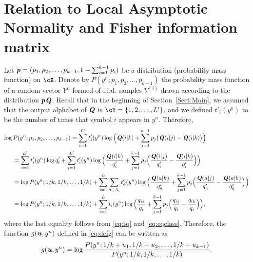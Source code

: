 \documentclass[11pt,onecolumn]{IEEEtran}
\def\mathbi#1{{\textbf{\textit #1}}}
\begin{document}
\section{Relation to Local Asymptotic Normality and Fisher information matrix}\label{ap:LAN}
Let 
$\mathbi{p}=(p_1,p_2,\dots,p_{k-1},1-\sum_{i=1}^{k-1}p_i)$ be a distribution (probability mass function) on $\cX$. 
Denote by $P(y^n;p_1,p_2,\dots,p_{k-1})$ the probability mass function of a random vector $Y^n$ formed of i.i.d. samples $Y^{(i)}$ 
drawn according to the distribution $\mathbi{p}\mathbi{Q}$. 
Recall that in the beginning of Section~\ref{Sect:Main}, we assumed that the output alphabet of $\mathbi{Q}$ is 
{$\cY=\{1,2,\dots,L'\}$}, and we defined $t'_i(y^n)$ to be the number of times that symbol $i$ appears in $y^n$. Therefore,
\begin{align}
 \log\, &P(y^n;p_1,p_2,\dots,p_{k-1}) 
 = \sum_{i=1}^{L'} t_i'(y^n) \log 
\Big(\mathbi{Q}(i|k)+\sum_{j=1}^{k-1}p_j\big(\mathbi{Q}(i|j)-\mathbi{Q}(i|k) \big) \Big)\nonumber \\
& = \sum_{i=1}^{L'} t_i'(y^n) \log q_i'  +
\sum_{i=1}^{L'} t_i'(y^n) \log 
\Big(\frac{\mathbi{Q}(i|k)}{q_i'}+
\sum_{j=1}^{k-1}p_j \Big(\frac{\mathbi{Q}(i|j)}{q_i'}-\frac{\mathbi{Q}(i|k)}{q_i'} \Big) \Big)\nonumber \\
& = \log P(y^n;1/k,1/k,\dots,1/k) +
\sum_{i=1}^{L} \sum_{a\in A_i} t_a'(y^n) \log 
\Big(\frac{\mathbi{Q}(a|k)}{q_a'}+
\sum_{j=1}^{k-1}p_j \Big(\frac{\mathbi{Q}(a|j)}{q_a'}-\frac{\mathbi{Q}(a|k)}{q_a'} \Big) \Big) \nonumber\\
& = \log P(y^n;1/k,1/k,\dots,1/k) +
\sum_{i=1}^{L}  t_i(y^n) \log 
\Big(\frac{q_{ik}}{q_i}+
\sum_{j=1}^{k-1}p_j \Big(\frac{q_{ij}}{q_i}-\frac{q_{ik}}{q_i} \Big) \Big), \label{eq:pt}
\end{align}
where the last equality follows from \eqref{eq:tq} and \eqref{eq:eqclass}.
Therefore, the function $g(\mathbi{u},y^n)$ defined in \eqref{eq:defg} can be written as
\begin{equation}\label{eq:guy}
 g(\mathbi{u},y^n) = \log \frac{P(y^n;1/k+u_1,1/k+u_2,\dots,1/k+u_{k-1})}{P(y^n;1/k,1/k,\dots,1/k)}.
\end{equation}
\end{document}
